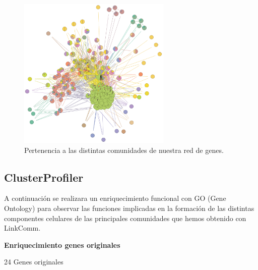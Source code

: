 \begin{figure}[h]
	\centering
	\includegraphics[width=0.65\textwidth]{figures/Grafo_Linkcomm.PNG}
	\caption{Pertenencia a las distintas comunidades de nuestra red de genes. }
	\label{fig:LinkComm3}
\end{figure}



\subsection{ClusterProfiler}

A continuación se realizara un enriquecimiento funcional con GO (Gene Ontology) para observar las funciones implicadas en la formación de las distintas componentes celulares de las principales comunidades que hemos obtenido con LinkComm.

\hfill

\textbf{Enriquecimiento genes originales}

24 Genes originales

\hfill

